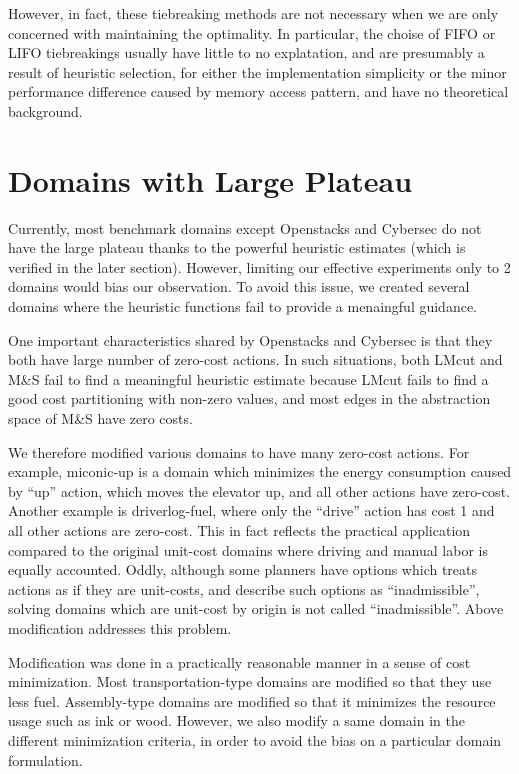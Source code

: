 However, in fact, these tiebreaking methods are not necessary when we
are only concerned with maintaining the optimality. In particular, the
choise of FIFO or LIFO tiebreakings usually have little to no
explatation, and are presumably a result of heuristic selection, for
either the implementation simplicity or the minor performance difference
caused by memory access pattern, and have no theoretical background.


\section{Domains with Large Plateau}

Currently, most benchmark domains except Openstacks and Cybersec do not
have the large plateau thanks to the powerful heuristic estimates (which
is verified in the later section). However, limiting our effective
experiments only to 2 domains would bias our observation. To avoid this
issue, we created several domains where the \sota heuristic functions
fail to provide a menaingful guidance.

One important characteristics shared by Openstacks and Cybersec is that they both
have large number of zero-cost actions. In such situations, both LMcut
and M\&S fail to find a meaningful heuristic estimate because LMcut fails to
find a good cost partitioning with non-zero values, and most edges in the abstraction space of
M\&S have zero costs.

We therefore modified various domains to have many zero-cost actions.
For example, miconic-up is a domain which minimizes the energy
consumption caused by ``up'' action, which moves the elevator up, and
all other actions have zero-cost. Another example is driverlog-fuel, where only
the ``drive'' action has cost 1 and all other actions are zero-cost.
This in fact reflects the practical application compared to the original
unit-cost domains where driving and manual labor is equally accounted.
Oddly, although some planners have options which treats actions as if
they are unit-costs, and describe such options as ``inadmissible'',
solving domains which are unit-cost by origin is not called
``inadmissible''. Above modification addresses this problem.

Modification was done in a practically reasonable manner in a sense of
cost minimization. Most transportation-type domains are modified so that
they use less fuel. Assembly-type domains are modified so that it
minimizes the resource usage such as ink or wood. However, we also
modify a same domain in the different minimization criteria, in order to
avoid the bias on a particular domain formulation.


